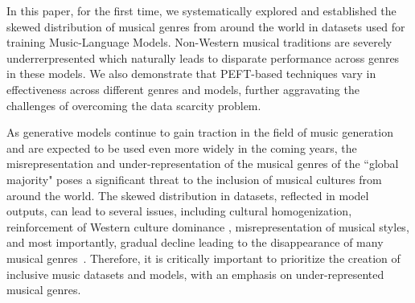 In this paper, for the first time, we systematically explored and established the skewed distribution of musical genres from around the world in datasets used for training Music-Language Models. Non-Western musical traditions are severely underrerpresented which naturally leads to disparate performance across genres in these models. We also demonstrate that PEFT-based techniques vary in effectiveness across different genres and models, further aggravating the challenges of overcoming the data scarcity problem.

As generative models continue to gain traction in the field of music generation and are expected to be used even more widely in the coming years, the misrepresentation and under-representation of the musical genres of the ``global majority" poses a significant threat to the inclusion of musical cultures from around the world. The skewed distribution in datasets, reflected in model outputs, can lead to several issues, including cultural homogenization, reinforcement of Western culture dominance \cite{crawford2016}, misrepresentation of musical styles, and most importantly, gradual decline leading to the disappearance of many musical genres~\cite{tan-2021,decolon_pop,intercontinental2023ai}. Therefore, it is critically important to prioritize the creation of inclusive music datasets and models, with an emphasis on under-represented musical genres.

